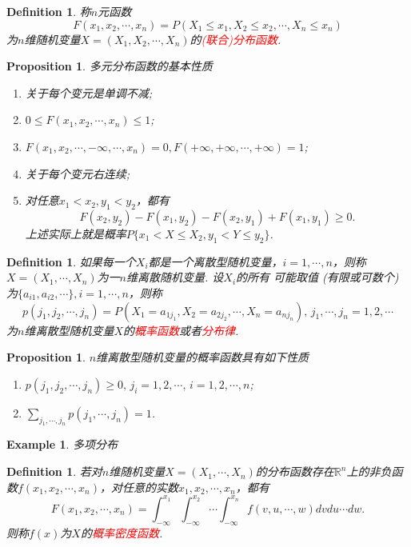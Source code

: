 \documentclass{article}
\newtheorem{proposition}[theorem]{Proposition}
\newtheorem{example}[theorem]{Example}
\newtheorem{definition}[theorem]{Definition}
\newcommand{\redt}[1]{\textcolor{red}{#1}}
\begin{document}
\begin{definition}
\rm 称$n$元函数
$$
F(x_1,x_2,\cdots,x_n) = P(X_1 \leq x_1, X_2 \leq x_2,\cdots, X_n \leq x_n)
$$
为$n$维随机变量$X=(X_1,X_2,\cdots,X_n)$的\redt{(联合)分布函数}. 
\end{definition}

\begin{proposition}
\rm 多元分布函数的基本性质
\begin{enumerate}
	\item 关于每个变元是单调不减;
	\item $0 \leq F(x_1,x_2,\cdots,x_n) \leq 1$;
	\item $F(x_1,x_2,\cdots,-\infty,\cdots,x_n) = 0,F(+\infty,+\infty,\cdots,+\infty) = 1$;
	\item 关于每个变元右连续;
	\item 对任意$x_1 < x_2, y_1 < y_2$，都有
	$$
	F(x_2,y_2)-F(x_1,y_2) - F(x_2,y_1) + F(x_1,y_1) \geq 0.
	$$
	上述实际上就是概率$P\{x_1 < X \leq X_2, y_1 < Y \leq y_2\}$.
\end{enumerate}
\end{proposition}


\begin{definition}
\rm 如果每一个$X_i$都是一个离散型随机变量，$i = 1,\cdots, n$，则称
$X = (X_1,\cdots, X_n)$为一$n$维离散随机变量. 设$X_i$的所有
可能取值 (有限或可数个) 为$\{a_{i1}, a_{i2}, \cdots \}, i = 1,\cdots, n$，则称
$$
p(j_1,j_2,\cdots,j_n) = P(X_1 = a_{1j_1}, X_2 = a_{2j_2},\cdots,X_n=a_{nj_n}),\, j_1,\cdots,j_n = 1,2,\cdots
$$
为$n$维离散型随机变量$X$的\redt{概率函数}或者\redt{分布律}. 
\end{definition}

\begin{proposition}
\rm $n$维离散型随机变量的概率函数具有如下性质
\begin{enumerate}
	\item $p(j_1,j_2,\cdots,j_n) \geq 0, \, j_i = 1,2,\cdots ,\, i=1,2,\cdots,n$;
	\item $\sum\limits_{j_1,\cdots,j_n} p(j_1,\cdots,j_n)=1$.
\end{enumerate}
\end{proposition}

\begin{example}
\rm 多项分布
\end{example}

\begin{definition}
\rm 若对$n$维随机变量$X = (X_1,\cdots, X_n)$的分布函数存在$\mathbb{R}^n$上的非负函数$f(x_1,x_2,\cdots,x_n)$，对任意的实数$x_1,x_2,\cdots,x_n$，都有
$$
F(x_1,x_2,\cdots,x_n) = \int_{-\infty}^{x_1}\int_{-\infty}^{x_2}\cdots\int_{-\infty}^{x_n}f(v,u,\cdots,w)dvdu\cdots dw.
$$
则称$f(x)$为$X$的\redt{概率密度函数}. 
\end{definition}
\end{document}

